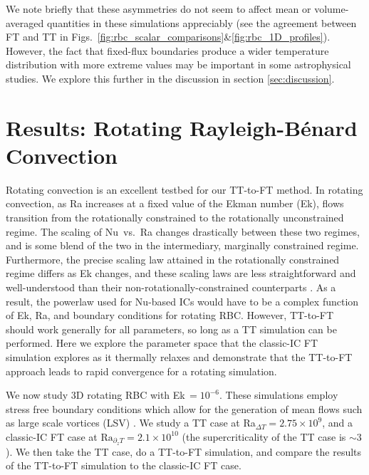 \documentclass[aps, pre, onecolumn, nofootinbib, notitlepage, groupedaddress, amsfonts, amssymb, amsmath, longbibliography, superscriptaddress]{revtex4-1}
\newcommand{\RB}{Rayleigh-B\'{e}nard }
\begin{document}
We note briefly that these asymmetries do not seem to affect mean or volume-averaged quantities in these simulations appreciably (see the agreement between FT and TT in Figs.~\ref{fig:rbc_scalar_comparisons}\&\ref{fig:rbc_1D_profiles}).
However, the fact that fixed-flux boundaries produce a wider temperature distribution with more extreme values may be important in some astrophysical studies.
We explore this further in the discussion in section \ref{sec:discussion}.





\section{Results: Rotating \RB Convection}
\label{sec:results_rotating}

Rotating convection is an excellent testbed for our TT-to-FT method.
In rotating convection, as Ra increases at a fixed value of the Ekman number (Ek), flows transition from the rotationally constrained to the rotationally unconstrained regime.
The scaling of Nu~vs.~Ra changes drastically between these two regimes, and is some blend of the two in the intermediary, marginally constrained regime.
Furthermore, the precise scaling law attained in the rotationally constrained regime differs as Ek changes, and these scaling laws are less straightforward and well-understood than their non-rotationally-constrained counterparts \cite{king&all2009, schmitz&tilgner2009, zhong&ahlers2010, julien&all2012, stevens&all2013, ecke2015, grooms2015, grooms&whitehead2015,  plumley&julien2019}.
As a result, the powerlaw used for Nu-based ICs would have to be a complex function of Ek, Ra, and boundary conditions for rotating RBC.
However, TT-to-FT should work generally for all parameters, so long as a TT simulation can be performed.
Here we explore the parameter space that the classic-IC FT simulation explores as it thermally relaxes and demonstrate that the TT-to-FT approach leads to rapid convergence for a rotating simulation.

We now study 3D rotating RBC with Ek$ \,= 10^{-6}$.
These simulations employ stress free boundary conditions which allow for the generation of mean flows such as large scale vortices (LSV) \citep{stellmach&all2014, rubio&all2014, guervilly&all2014, guervilly&hughes2017, favier&all2014, favier&all2019, couston&all2020}.
We study a TT case at Ra$_{\Delta T} = 2.75\times 10^9$, and a classic-IC FT case at $\text{Ra}_{\partial_z T} = 2.1 \times 10^{10}$ (the supercriticality of the TT case is $\sim 3$).
We then take the TT case, do a TT-to-FT simulation, and compare the results of the TT-to-FT simulation to the classic-IC FT case.
\end{document}
